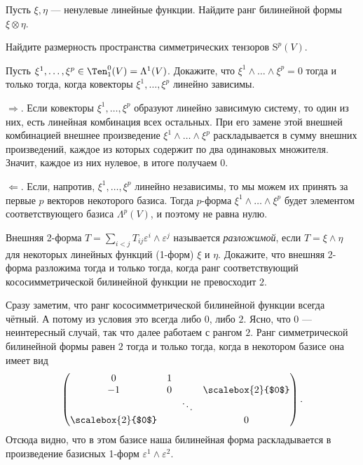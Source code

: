\begin{problem}
    Пусть $\xi, \eta$ --- ненулевые линейные функции. Найдите ранг билинейной формы $\xi \otimes \eta$.
\end{problem}

\begin{problem}
    Найдите размерность пространства симметрических тензоров $\mathrm{S}^p(V)$.
\end{problem}

\begin{problem}
    Пусть $\xi^1, \ldots, \xi^p \in \Ten_1^0(V) = \Lambda^1(V)$. Докажите, что $\xi^1 \wedge \ldots \wedge \xi^p = 0$ тогда и только тогда, когда ковекторы $\xi^1, \ldots, \xi^p$ линейно зависимы.
\end{problem}

\begin{solution}
    $\Rightarrow$. Если ковекторы $\xi^1, \ldots, \xi^p$ образуют линейно зависимую систему, то один из них, есть линейная комбинация всех остальных. При его замене этой внешней комбинацией внешнее произведение $\xi^1 \wedge \ldots \wedge \xi^p$ раскладывается в сумму внешних произведений, каждое из которых содержит по два одинаковых множителя. Значит, каждое из них нулевое, в итоге получаем $0$.

    $\Leftarrow$. Если, напротив, $\xi^1, \ldots, \xi^p$ линейно независимы, то мы можем их принять за первые $p$ векторов некоторого базиса. Тогда $p$-форма $\xi^1 \wedge \ldots \wedge \xi^p$ будет элементом соответствующего базиса $\Lambda^p(V)$, и поэтому не равна нулю.
\end{solution}

\begin{problem}\footnotemark
    Внешняя 2-форма $T = \sum\limits_{i < j}T_{ij}\varepsilon^i \wedge \varepsilon^j$ называется \textit{разложимой}, если $T = \xi \wedge \eta$ для некоторых линейных функций (1-форм) $\xi$ и $\eta$. Докажите, что внешняя 2-форма разложима тогда и только тогда, когда ранг соответствующий кососимметрической билинейной функции не превосходит $2$.
\end{problem}


\begin{solution}
    Сразу заметим, что ранг кососимметрической билинейной функции всегда чётный. А потому из условия это всегда либо $0$, либо $2$. Ясно, что $0$ --- неинтересный случай, так что далее работаем с рангом $2$. Ранг симметрической билинейной формы равен $2$ тогда и только тогда, когда в некотором базисе она имеет вид
    \[
        \begin{pmatrix}
            0 & 1 & & \\
            -1 & 0 & & \scalebox{2}{$0$} \\
             & & \ddots & \\
             \scalebox{2}{$0$} & & & 0
        \end{pmatrix}.
    \]
    Отсюда видно, что в этом базисе наша билинейная форма раскладывается в произведение базисных 1-форм $\varepsilon^1 \wedge \varepsilon^2$.
\end{solution}

